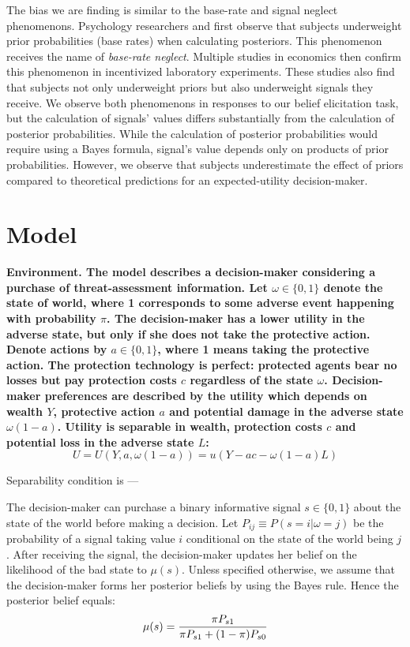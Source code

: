 \documentclass[12pt,a4paper]{article}
\begin{document}
The bias we are finding is similar to the base-rate and signal neglect phenomenons. Psychology researchers \citet{hammerton_case_1973} and \citet{kahneman_psychology_1973} first observe that subjects underweight prior probabilities (base rates) when calculating posteriors. This phenomenon receives the name of \textit{base-rate neglect}. Multiple studies in economics then confirm \citep*{grether_testing_1992, holt_update_2009} this phenomenon in incentivized laboratory experiments. These studies also find that subjects not only underweight priors but also underweight signals they receive.  We observe both phenomenons in responses to our belief elicitation task, but the calculation of signals' values differs substantially from the calculation of posterior probabilities. While the calculation of posterior probabilities would require using a Bayes formula, signal's value depends only on products of prior probabilities. However, we observe that subjects underestimate the effect of priors compared to theoretical predictions for an expected-utility decision-maker.


\vspace{20pt}

\section{Model}
\vspace{10pt}
\bf Environment. \rm The model describes a decision-maker considering a purchase of threat-assessment information. Let $\omega \in \{0,1\}$ denote the state of world, where 1 corresponds to some adverse event happening with probability $\pi$. The decision-maker has a lower utility in the adverse state, but only if she does not take the protective action. Denote actions by $a\in\{0,1\}$, where 1 means taking the protective action. The protection technology is perfect: protected agents bear no losses but pay protection costs $c$ regardless of the state $\omega$. Decision-maker preferences are described by the utility which depends on wealth $Y$, protective action $a$ and potential damage in the adverse state $\omega(1-a)$. Utility is separable in wealth, protection costs $c$ and potential loss in the adverse state $L$:
\begin{equation}
U=U(Y,a,\omega(1-a))=u(Y-ac-\omega(1-a)L)
\end{equation}

Separability condition is ---

The decision-maker can purchase a binary informative signal $s\in\{0,1\}$ about the state of the world before making a decision. Let $P_{ij}\equiv P(s=i|\omega=j)$ be the probability of a signal taking value $i$ conditional on the state of the world being $j$.  After receiving the signal, the decision-maker updates her belief on the likelihood of the bad state to $\mu(s)$. Unless specified otherwise, we assume that the decision-maker forms her posterior beliefs by using the Bayes rule. Hence the posterior belief equals:
\begin{equation}
\mu(s)= {\pi P_{s1} \over \pi P_{s1}+(1-\pi)P_{s0}}
\end{equation}
\end{document}
